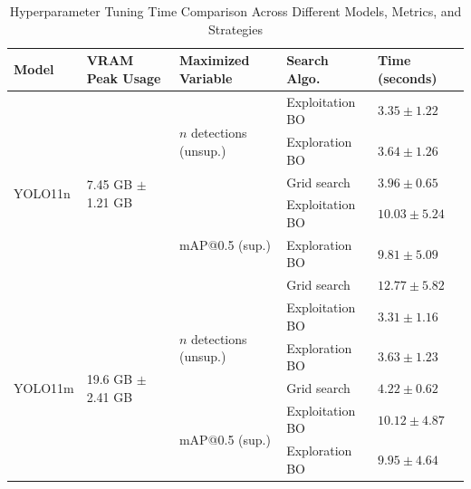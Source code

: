 \begin{table}[htbp]
\centering
\caption{Hyperparameter Tuning Time Comparison Across Different Models, Metrics, and Strategies}
\label{tab:hptuning_time}
\small
    \begin{tabular}{lllll}
    \toprule
    \textbf{Model} & \textbf{VRAM Peak Usage}&\textbf{Maximized Variable} & \textbf{Search Algo.} & \textbf{Time (seconds)} \\
    \midrule
    \multirow{6}{*}{YOLO11n} & \multirow{6}{*}{7.45 GB $\pm$ 1.21 GB} & \multirow{3}{*}{$n$ detections (unsup.)} & Exploitation BO & $3.35 \pm 1.22$ \\
                            &                                         &                                          & Exploration BO & $3.64 \pm 1.26$ \\
                            &                                         &                                          & Grid search & $3.96 \pm 0.65$ \\
    \cmidrule{3-5}
                            &                                         & \multirow{3}{*}{mAP@0.5 (sup.)}          & Exploitation BO & $10.03 \pm 5.24$ \\
                            &                                         &                                          & Exploration BO & $9.81 \pm 5.09$ \\
                            &                                         &                                          & Grid search & $12.77 \pm 5.82$ \\
    \midrule
    \multirow{6}{*}{YOLO11m} & \multirow{6}{*}{19.6 GB $\pm$ 2.41 GB} & \multirow{3}{*}{$n$ detections (unsup.)} & Exploitation BO & $3.31 \pm 1.16$ \\
                            &                                       &                                            & Exploration BO & $3.63 \pm 1.23$ \\
                            &                                       &                                            & Grid search & $4.22 \pm 0.62$ \\
    \cmidrule{3-5}
                            &                                       &    \multirow{3}{*}{mAP@0.5 (sup.)}         & Exploitation BO & $10.12 \pm 4.87$ \\
                            &                                       &                                            & Exploration BO & $9.95 \pm 4.64$ \\

\end{tabular}
\end{table}
